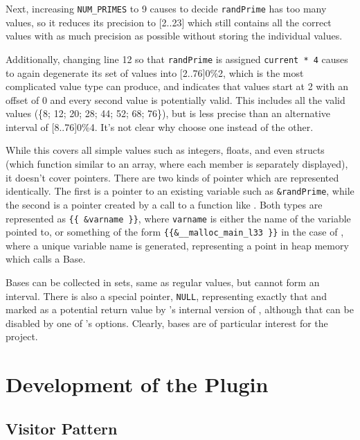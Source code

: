 Next, increasing \texttt{NUM\_PRIMES} to 9 causes  to decide \texttt{randPrime} has too many values, so it reduces its precision to [2..23] which still contains all the correct values with as much precision as possible without storing the individual values.

Additionally, changing line 12 so that \texttt{randPrime} is assigned \texttt{current * 4} causes  to again degenerate its set of values into [2..76]0\%2, which is the most complicated value type  can produce, and indicates that values start at 2 with an offset of 0 and every second value is potentially valid. This includes all the valid values (\{8; 12; 20; 28; 44; 52; 68; 76\}), but is less precise than an alternative interval of [8..76]0\%4. It's not clear why  choose one instead of the other.

While this covers all simple values such as integers, floats, and even structs (which function similar to an array, where each member is separately displayed), it doesn't cover pointers. There are two kinds of pointer which are represented identically. The first is a pointer to an existing variable such as \texttt{\&randPrime}, while the second is a pointer created by a call to a function like \malloc{}. Both types are represented as \texttt{\{\{ \&varname \}\}}, where \texttt{varname} is either the name of the variable pointed to, or something of the form \texttt{\{\{\&\_\_malloc\_main\_l33 \}\}} in the case of \malloc{}, where a unique variable name is generated, representing a point in heap memory which  calls a Base.

Bases can be collected in sets, same as regular values, but cannot form an interval. There is also a special pointer, \texttt{NULL}, representing exactly that and marked as a potential return value by 's internal version of \malloc{}, although that can be disabled by one of 's options. Clearly, bases are of particular interest for the project.

\section{Development of the  Plugin}

\subsection{Visitor Pattern}


